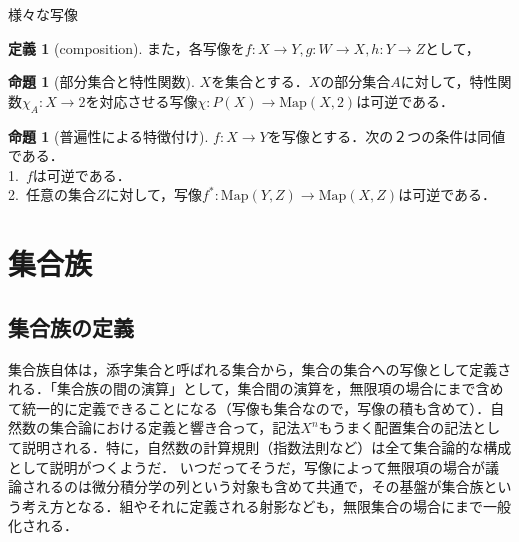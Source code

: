 \documentclass[uplatex, 12pt, dvipdfmx]{jsreport}
\theoremstyle{definition}
\newtheorem{proposition}[theorem]{命題}
\newtheorem{definition}[theorem]{定義}
\theoremstyle{StatementsWithStar}
\theoremstyle{StatementsWithStar2}
\theoremstyle{StatementsWithStar3}
\theoremstyle{StatementsWithCCirc}
\theoremstyle{definition}
\begin{document}
\begin{itembox}[l]{様々な写像}
\begin{definition}[composition]
		また，各写像を$f:X\to Y, g:W\to X, h:Y\to Z$として，
		\begin{center}\end{center}
	\end{definition}
\end{itembox}

\begin{proposition}[部分集合と特性関数]
	$X$を集合とする．$X$の部分集合$A$に対して，特性関数$\chi_A:X\to 2$を対応させる写像$\chi :P(X)\to \mathrm{Map}(X,2)$は可逆である．
\end{proposition}

\begin{proposition}[普遍性による特徴付け]$f:X\to Y$を写像とする．次の２つの条件は同値である．\rm{}\\
    1.\, $f$は可逆である．\\
    2.\, 任意の集合$Z$に対して，写像$f^*:\mathrm{Map}(Y,Z)\to\mathrm{Map}(X,Z)$は可逆である．
\end{proposition}

\section{集合族}

\subsection{集合族の定義}
集合族自体は，添字集合と呼ばれる集合から，集合の集合への写像として定義される．「集合族の間の演算」として，集合間の演算を，無限項の場合にまで含めて統一的に定義できることになる（写像も集合なので，写像の積も含めて）．自然数の集合論における定義と響き合って，記法$X^n$もうまく配置集合の記法として説明される．特に，自然数の計算規則（指数法則など）は全て集合論的な構成として説明がつくようだ．
いつだってそうだ，写像によって無限項の場合が議論されるのは微分積分学の列という対象も含めて共通で，その基盤が集合族という考え方となる．組やそれに定義される射影なども，無限集合の場合にまで一般化される．
\end{document}
